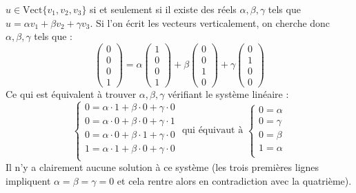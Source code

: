 {\begin{enumerate}
{$u \in \text{Vect}\{v_1,v_2,v_3\}$ si et seulement si 
il existe des réels $\alpha,\beta,\gamma$ tels que $u=\alpha v_1 + \beta v_2 + \gamma v_3$.
Si l'on écrit les vecteurs verticalement, on cherche donc $\alpha,\beta,\gamma$ tels que :
$$\begin{pmatrix} 0 \\ 0 \\ 0 \\1\end{pmatrix}= \alpha \begin{pmatrix} 1 \\ 0 \\ 0 \\1\end{pmatrix}
+ \beta \begin{pmatrix} 0 \\ 0 \\ 1 \\ 0 \end{pmatrix}+\gamma\begin{pmatrix} 0 \\ 1 \\ 0 \\0\end{pmatrix}$$
Ce qui est équivalent à trouver $\alpha,\beta,\gamma$ vérifiant le système linéaire :
$$\begin{cases}
0 = \alpha \cdot 1 + \beta \cdot 0 + \gamma \cdot 0   \\
0 = \alpha \cdot 0 + \beta \cdot 0 + \gamma \cdot 1   \\
0 = \alpha \cdot 0 + \beta \cdot 1 + \gamma \cdot 0   \\
1 = \alpha \cdot 1 + \beta \cdot 0 + \gamma \cdot 0   \\
\end{cases}
\text{ qui équivaut à } 
\begin{cases}
0 = \alpha \\
0 = \gamma \\
0 = \beta  \\
1 = \alpha \\
\end{cases}
$$
Il n'y a clairement aucune solution à ce système (les trois premières lignes impliquent $\alpha=\beta=\gamma=0$
et cela rentre alors en contradiction avec la quatrième).

\bigskip


}
\end{enumerate}}
